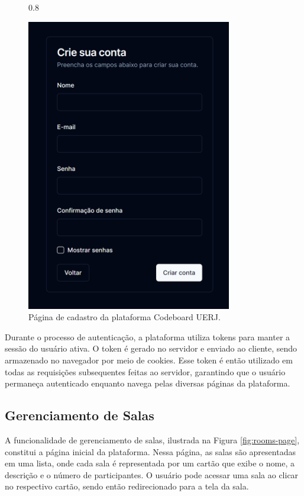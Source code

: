 \begin{figure}[H]{0.8\textwidth}
    \centering
    \caption{Página de cadastro da plataforma Codeboard UERJ.}
    \label{fig:signup-page}
    \includegraphics[width=0.8\textwidth]{assets/codeboard/signup-page.png}
\end{figure}

Durante o processo de autenticação, a plataforma utiliza tokens para manter a sessão do usuário ativa. O token é gerado no servidor e enviado ao cliente, sendo armazenado no navegador por meio de cookies. Esse token é então utilizado em todas as requisições subsequentes feitas ao servidor, garantindo que o usuário permaneça autenticado enquanto navega pelas diversas páginas da plataforma.

\subsection{Gerenciamento de Salas}

A funcionalidade de gerenciamento de salas, ilustrada na Figura \ref{fig:rooms-page}, constitui a página inicial da plataforma. Nessa página, as salas são apresentadas em uma lista, onde cada sala é representada por um cartão que exibe o nome, a descrição e o número de participantes. O usuário pode acessar uma sala ao clicar no respectivo cartão, sendo então redirecionado para a tela da sala.

